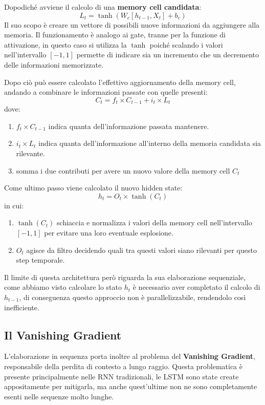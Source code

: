 \documentclass{article}
\begin{document}
Dopodiché avviene il calcolo di una \textbf{memory cell candidata}:
$$L_t = \tanh(W_c[h_{t-1}, X_t] + b_c)$$
Il suo scopo è creare un vettore di possibili nuove informazioni da aggiungere alla memoria.
Il funzionamento è analogo ai gate, tranne per la funzione di attivazione, in questo caso si utilizza la $\tanh$
poiché scalando i valori nell'intervallo $[-1,1]$ permette di indicare sia un incremento che un decremento delle informazioni memorizzate.

Dopo ciò può essere calcolato l'effettivo aggiornamento della memory cell, andando a combinare le informazioni passate con quelle presenti:
$$C_t = f_t \times C_{t-1} + i_t \times L_t$$
dove:
\begin{enumerate}
    \item $f_t \times C_{t-1}$ indica quanta dell'informazione passata mantenere.
    \item $i_t \times L_t$ indica quanta dell'informazione all'interno della memoria candidata sia rilevante.
    \item somma i due contributi per avere un nuovo valore della memory cell $C_t$
\end{enumerate}

Come ultimo passo viene calcolato il nuovo hidden state:
$$h_t = O_t \times \tanh(C_t)$$
in cui:
\begin{enumerate}
    \item $\tanh(C_t)$ schiaccia e normalizza i valori della memory cell nell'intervallo $[-1,1]$ per evitare una loro eventuale esplosione.
    \item $O_t$ agisce da filtro decidendo quali tra questi valori siano rilevanti per questo step temporale.

\end{enumerate}

Il limite di questa architettura però riguarda la sua elaborazione sequenziale, come abbiamo visto calcolare lo stato $h_t$ è necessario aver completato il calcolo di $h_{t-1}$, di conseguenza questo approccio non è parallelizzabile, rendendolo così inefficiente.
\subsection{Il Vanishing Gradient}
L'elaborazione in sequenza porta inoltre al problema del \textbf{Vanishing Gradient}, responsabile della perdita di contesto a lungo raggio.
Questa problematica è presente principalmente nelle RNN tradizionali, le LSTM sono state create appositamente per mitigarla, ma anche quest'ultime non ne sono completamente esenti nelle sequenze molto lunghe.
\end{document}
